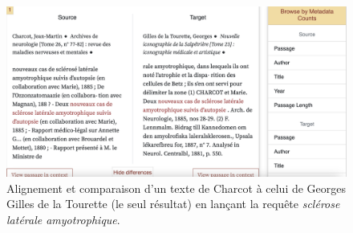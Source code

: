 \begin{figure}[!ht]
    \centering
    \includegraphics[width=1\textwidth]{img/textpair.png}
    \caption{Alignement et comparaison d'un texte de Charcot à celui de Georges Gilles de la Tourette (le seul résultat) en lançant la requête \textit{sclérose latérale amyotrophique}.}
    \label{fig:textpair}
\end{figure}

